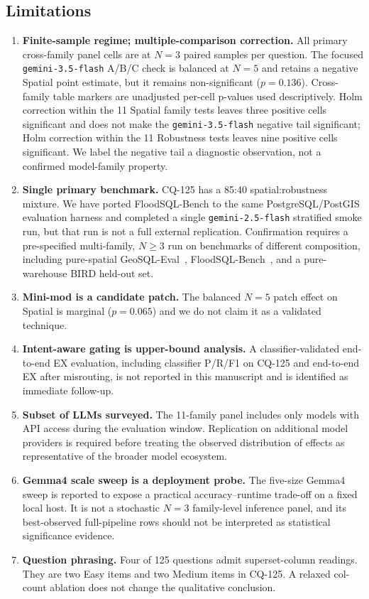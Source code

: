\documentclass[11pt]{article}
\begin{document}
\subsection{Limitations}
\label{sec:discussion:limitations}

\begin{enumerate}[itemsep=2pt]
\item \textbf{Finite-sample regime; multiple-comparison correction.} All primary cross-family panel cells are at $N{=}3$ paired samples per question. The focused \texttt{gemini-3.5-flash} A/B/C check is balanced at $N{=}5$ and retains a negative Spatial point estimate, but it remains non-significant ($p=0.136$). Cross-family table markers are unadjusted per-cell p-values used descriptively. Holm correction within the 11 Spatial family tests leaves three positive cells significant and does not make the \texttt{gemini-3.5-flash} negative tail significant; Holm correction within the 11 Robustness tests leaves nine positive cells significant. We label the negative tail a diagnostic observation, not a confirmed model-family property.
\item \textbf{Single primary benchmark.} CQ-125 has a 85:40 spatial:robustness mixture. We have ported FloodSQL-Bench to the same PostgreSQL/PostGIS evaluation harness and completed a single \texttt{gemini-2.5-flash} stratified smoke run, but that run is not a full external replication. Confirmation requires a pre-specified multi-family, $N{\geq}3$ run on benchmarks of different composition, including pure-spatial GeoSQL-Eval~\citep{hou2026geosql}, FloodSQL-Bench~\citep{liu2025floodsql}, and a pure-warehouse BIRD held-out set.
\item \textbf{Mini-mod is a candidate patch.} The balanced $N{=}5$ patch effect on Spatial is marginal ($p=0.065$) and we do not claim it as a validated technique.
\item \textbf{Intent-aware gating is upper-bound analysis.} A classifier-validated end-to-end EX evaluation, including classifier P/R/F1 on CQ-125 and end-to-end EX after misrouting, is not reported in this manuscript and is identified as immediate follow-up.
\item \textbf{Subset of LLMs surveyed.} The 11-family panel includes only models with API access during the evaluation window. Replication on additional model providers is required before treating the observed distribution of effects as representative of the broader model ecosystem.
\item \textbf{Gemma4 scale sweep is a deployment probe.} The five-size Gemma4 sweep is reported to expose a practical accuracy--runtime trade-off on a fixed local host. It is not a stochastic $N{=}3$ family-level inference panel, and its best-observed full-pipeline rows should not be interpreted as statistical significance evidence.
\item \textbf{Question phrasing.} Four of 125 questions admit superset-column readings. They are two Easy items and two Medium items in CQ-125. A relaxed col-count ablation does not change the qualitative conclusion.
\end{enumerate}
\end{document}
